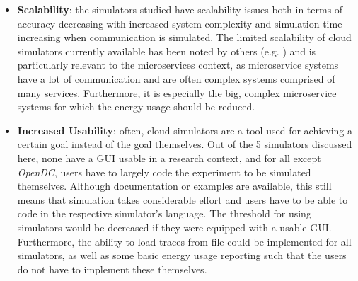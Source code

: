 \begin{itemize}
    \item \textbf{Scalability}: the simulators studied have scalability issues both in terms of accuracy decreasing with increased system complexity and simulation time increasing when communication is simulated. The limited scalability of cloud simulators currently available has been noted by others (e.g. \cite{martone_evaluation_2023}) and is particularly relevant to the microservices context, as microservice systems have a lot of communication and are often complex systems comprised of many services. Furthermore, it is especially the big, complex microservice systems for which the energy usage should be reduced.
    \item \textbf{Increased Usability}: often, cloud simulators are a tool used for achieving a certain goal instead of the goal themselves. Out of the 5 simulators discussed here, none have a GUI usable in a research context, and for all except \textit{OpenDC}, users have to largely code the experiment to be simulated themselves. Although documentation or examples are available, this still means that simulation takes considerable effort and users have to be able to code in the respective simulator's language. The threshold for using simulators would be decreased if they were equipped with a usable GUI. Furthermore, the ability to load traces from file could be implemented for all simulators, as well as some basic energy usage reporting such that the users do not have to implement these themselves. 
\end{itemize}